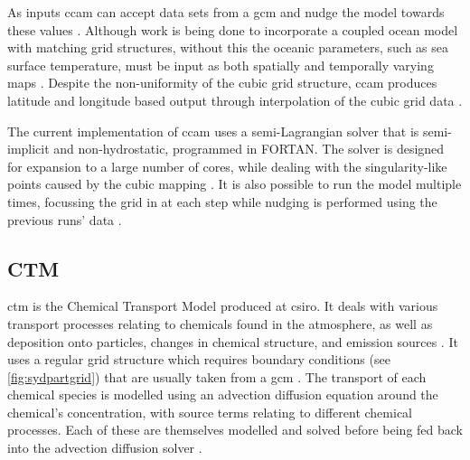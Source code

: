 		As inputs \gls{ccam} can accept data sets from a \gls{gcm} and nudge the model towards these values \citep{mcgregor:2005wz}. Although work is being done to incorporate a coupled ocean model with matching grid structures, without this the oceanic parameters, such as sea surface temperature, must be input as both spatially and temporally varying maps \citep{mcgregor2008updated}. Despite the non-uniformity of the cubic grid structure, \gls{ccam} produces latitude and longitude based output through interpolation of the cubic grid data \citep{thatcher:2015wy}.

		The current implementation of \gls{ccam} uses a semi-Lagrangian solver that is semi-implicit and non-hydrostatic, programmed in FORTAN. The solver is designed for expansion to a large number of cores, while dealing with the singularity-like points caused by the cubic mapping \citep{thatcher:2015wy}. It is also possible to run the model multiple times, focussing the grid in at each step while nudging is performed using the previous runs' data \citep{mcgregor2008updated}.



		\subsection{CTM}
		\label{subsec:ctm}

		\gls{ctm} is the Chemical Transport Model produced at \gls{csiro}. It deals with various transport processes relating to chemicals found in the atmosphere, as well as deposition onto particles, changes in chemical structure, and emission sources \citep{cope:2009tz}. It uses a regular grid structure which requires boundary conditions (see \cref{fig:sydpartgrid}) that are usually taken from a \gls{gcm} \citep{cope:2014tw}. The transport of each chemical species is modelled using an advection diffusion equation around the chemical's concentration, with source terms relating to different chemical processes. Each of these are themselves modelled and solved before being fed back into the advection diffusion solver \citep{cope:2009tz}. 

